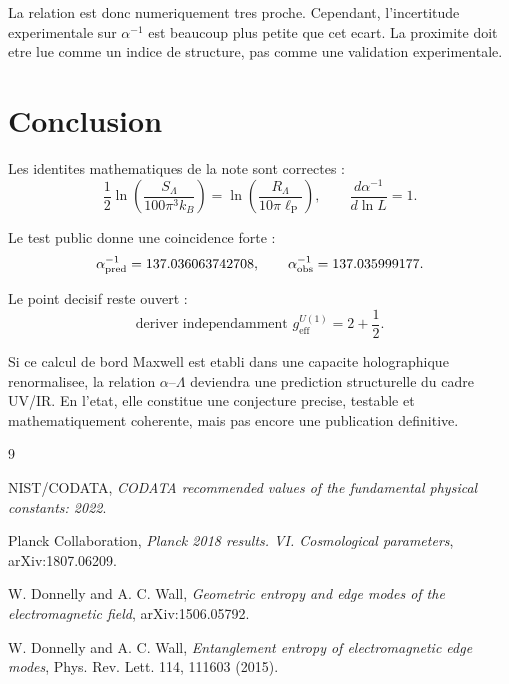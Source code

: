 \documentclass[11pt,a4paper]{article}
\newcommand{\lP}{\ell_{\mathrm P}}
\newcommand{\RL}{R_{\Lambda}}
\newcommand{\SL}{S_{\Lambda}}
\newcommand{\geff}{g_{\mathrm{eff}}^{U(1)}}
\begin{document}
La relation est donc numeriquement tres proche. Cependant, l'incertitude
experimentale sur \(\alpha^{-1}\) est beaucoup plus petite que cet ecart. La
proximite doit etre lue comme un indice de structure, pas comme une validation
experimentale.

\section{Conclusion}

Les identites mathematiques de la note sont correctes :
\begin{equation}
\frac12\ln\left(\frac{\SL}{100\pi^3 k_B}\right)
=\ln\left(\frac{\RL}{10\pi\lP}\right),
\qquad
\frac{d\alpha^{-1}}{d\ln L}=1.
\end{equation}

Le test public donne une coincidence forte :
\begin{equation}
\alpha^{-1}_{\rm pred}=137.036063742708,
\qquad
\alpha^{-1}_{\rm obs}=137.035999177.
\end{equation}

Le point decisif reste ouvert :
\begin{equation}
\boxed{\text{deriver independamment }\geff=2+\frac12.}
\end{equation}

Si ce calcul de bord Maxwell est etabli dans une capacite holographique
renormalisee, la relation \(\alpha\)--\(\Lambda\) deviendra une prediction
structurelle du cadre UV/IR. En l'etat, elle constitue une conjecture precise,
testable et mathematiquement coherente, mais pas encore une publication
definitive.

\begin{thebibliography}{9}

NIST/CODATA, \emph{CODATA recommended values of the fundamental physical
constants: 2022}.

Planck Collaboration, \emph{Planck 2018 results. VI. Cosmological parameters},
arXiv:1807.06209.

W. Donnelly and A. C. Wall, \emph{Geometric entropy and edge modes of the
electromagnetic field}, arXiv:1506.05792.

W. Donnelly and A. C. Wall, \emph{Entanglement entropy of electromagnetic edge
modes}, Phys. Rev. Lett. 114, 111603 (2015).

\end{thebibliography}
\end{document}
